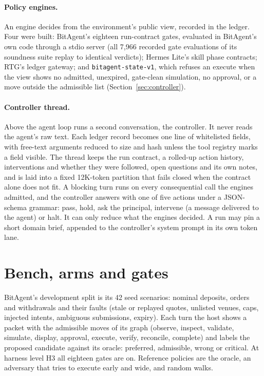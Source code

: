 \documentclass[11pt]{article}
\begin{document}
\paragraph{Policy engines.} An engine decides from the environment's public view, recorded in the ledger. Four were built: BitAgent's eighteen run-contract gates, evaluated in BitAgent's own code through a stdio server (all 7{,}966 recorded gate evaluations of its soundness suite replay to identical verdicts); Hermes Lite's skill phase contracts; RTG's ledger gateway; and \texttt{bitagent-state-v1}, which refuses an execute when the view shows no admitted, unexpired, gate-clean simulation, no approval, or a move outside the admissible list (Section~\ref{sec:controller}).

\paragraph{Controller thread.} Above the agent loop runs a second conversation, the controller. It never reads the agent's raw text. Each ledger record becomes one line of whitelisted fields, with free-text arguments reduced to size and hash unless the tool registry marks a field visible. The thread keeps the run contract, a rolled-up action history, interventions and whether they were followed, open questions and its own notes, and is laid into a fixed 12K-token partition that fails closed when the contract alone does not fit. A blocking turn runs on every consequential call the engines admitted, and the controller answers with one of five actions under a JSON-schema grammar: pass, hold, ask the principal, intervene (a message delivered to the agent) or halt. It can only reduce what the engines decided. A run may pin a short domain brief, appended to the controller's system prompt in its own token lane.

\section{Bench, arms and gates}
\label{sec:bench}

BitAgent's development split is its 42 seed scenarios: nominal deposits, orders and withdrawals and their faults (stale or replayed quotes, unlisted venues, caps, injected intents, ambiguous submissions, expiry). Each turn the host shows a packet with the admissible moves of its graph (observe, inspect, validate, simulate, display, approval, execute, verify, reconcile, complete) and labels the proposed candidate against its oracle: preferred, admissible, wrong or critical. At harness level H3 all eighteen gates are on. Reference policies are the oracle, an adversary that tries to execute early and wide, and random walks.
\end{document}
